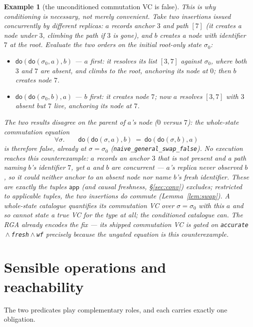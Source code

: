 \documentclass[11pt]{article}
\newtheorem{example}[theorem]{Example}
\newcommand{\Sinit}{\sigma_0}
\newcommand{\dolab}{\mathsf{do}}
\newcommand{\app}{\mathsf{app}}
\newcommand{\lean}[1]{\texttt{\small #1}}
\begin{document}
\begin{example}[the unconditioned commutation VC is false]
\label{ex:uncond}
This is why conditioning is necessary, not merely convenient. Take two
insertions issued concurrently by different replicas: $a$ records anchor $3$ and
path $[7]$ (it creates a node under $3$, climbing the path if $3$ is gone), and
$b$ creates a node with identifier $7$ at the root. Evaluate the two orders on the
initial root-only state $\Sinit$:
\begin{itemize}[leftmargin=1.4em]
\item $\dolab(\dolab(\Sinit,a),b)$ --- $a$ first: it resolves its list $[3,7]$
  against $\Sinit$, where both $3$ and $7$ are absent, and \emph{climbs to the
  root}, anchoring its node at $0$; then $b$ creates node $7$.
\item $\dolab(\dolab(\Sinit,b),a)$ --- $b$ first: it creates node $7$; now $a$
  resolves $[3,7]$ with $3$ absent but $7$ \emph{live}, anchoring its node at $7$.
\end{itemize}
The two results disagree on the parent of $a$'s node ($0$ versus $7$): the
whole-state commutation equation
\[
  \forall\sigma.\qquad \dolab(\dolab(\sigma,a),b)\ =\ \dolab(\dolab(\sigma,b),a)
\]
is therefore \emph{false}, already at $\sigma=\Sinit$
(\lean{naive\_general\_swap\_false}).
No execution reaches this counterexample: $a$ records an anchor $3$ that is not
present and a path naming $b$'s identifier $7$, yet $a$ and $b$ are
\emph{concurrent} --- $a$'s replica never observed $b$, so it could neither anchor
to an absent node nor name $b$'s fresh identifier. These are exactly the tuples
$\app$ (and causal freshness, \S\ref{sec:conv}) excludes; restricted to applicable
tuples, the two insertions \emph{do} commute (Lemma~\ref{lem:swap}). A whole-state
catalogue quantifies its commutation VC over $\sigma=\Sinit$ with this $a$ and so
cannot state a true VC for the type at all; the conditioned catalogue can. The RGA
already encodes the fix --- its shipped commutation VC is \emph{gated} on
\lean{accurate}${}\wedge{}$\lean{fresh}${}\wedge{}$\lean{wf} precisely because the
ungated equation is this counterexample.
\end{example}

\section{Sensible operations and reachability}
\label{sec:sensible}

The two predicates play complementary roles, and each carries exactly one
obligation.
\end{document}
